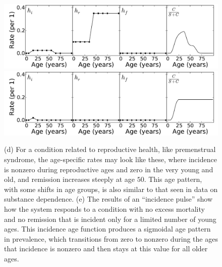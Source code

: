 \begin{figure}
\begin{center}
\includegraphics[width=\textwidth]{forward-sim-reproductive.pdf}
\includegraphics[width=\textwidth]{forward-sim-incidence_pulse.pdf}
\caption[More examples of different diseases and their age-specific rates.]{(d) For a condition related to reproductive health, like
  premenstrual syndrome, the age-specific rates may look like these,
  where incidence is nonzero during reproductive ages and zero in
  the very young and old, and remission increases steeply at age
  $50$. This age pattern, with some shifts in age groups, is also similar
  to that seen in data on substance dependence.
(e) The results of an ``incidence pulse'' show how the system
  responds to a condition with no excess mortality and no remission
  that is incident only for a limited number of young ages.  This
  incidence age function produces a sigmoidal age pattern in
  prevalence, which transitions from zero to nonzero during the ages
  that incidence is nonzero and then stays at this value for all
  older ages.}
\label{forward-sim-ex3b}
\end{center}
\end{figure}


